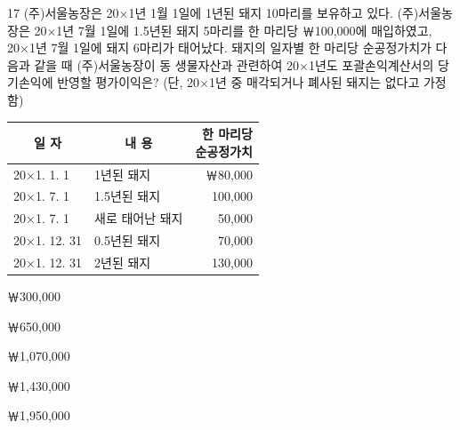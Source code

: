 \begin{question}{17}
(주)서울농장은 20×1년 1월 1일에 1년된 돼지 10마리를 보유하고 있다. (주)서울농장은 20×1년 7월 1일에 1.5년된 돼지 5마리를 한 마리당 ￦100,000에 매입하였고, 20×1년 7월 1일에 돼지 6마리가 태어났다. 돼지의 일자별 한 마리당 순공정가치가 다음과 같을 때 (주)서울농장이 동 생물자산과 관련하여 20×1년도 포괄손익계산서의 당기손익에 반영할 평가이익은? (단, 20×1년 중 매각되거나 폐사된 돼지는 없다고 가정함)

{\small\centering
\begin{tabular}{|l|l|r|}
\hline
\multicolumn{1}{|c|}{일 자} & \multicolumn{1}{c|}{내 용} & \makecell{한 마리당\\순공정가치} \\
\hline
20×1. 1. 1 & 1년된 돼지 & ￦80,000 \\
20×1. 7. 1 & 1.5년된 돼지 & 100,000 \\
20×1. 7. 1 & 새로 태어난 돼지 & 50,000 \\
20×1. 12. 31 & 0.5년된 돼지 & 70,000 \\
20×1. 12. 31 & 2년된 돼지 & 130,000 \\
\hline
\end{tabular}\par}

\begin{choices}
  \item ￦300,000
  \item ￦650,000
  \item ￦1,070,000
  \item ￦1,430,000
  \item ￦1,950,000
\end{choices}
\end{question}
